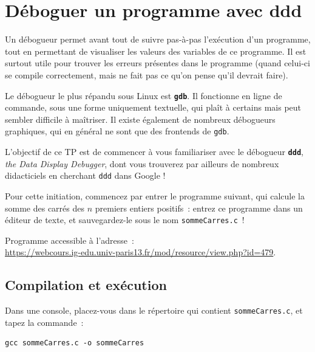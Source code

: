 \documentclass[12pt,a4paper]{article}
\begin{document}

\newcommand{\puis}{\ensuremath{\rightarrow\ }}

\section{Déboguer un programme avec ddd}

Un débogueur permet avant tout de suivre pas-à-pas l'exécution d'un
programme, tout en permettant de visualiser les valeurs des variables
de ce programme. Il est surtout utile pour trouver les erreurs
présentes dans le programme (quand celui-ci se compile correctement,
mais ne fait pas ce qu'on pense qu'il devrait faire). 

Le débogueur le plus répandu sous Linux est {\bf \tt gdb}. Il fonctionne
en ligne de commande, sous une forme uniquement textuelle, qui plaît à
certains mais peut sembler difficile à maîtriser. Il existe également de
nombreux débogueurs graphiques, qui en général ne sont que des
frontends de {\tt gdb}.

L'objectif de ce TP est de commencer à vous familiariser avec le
débogueur {\tt \bf ddd}, \emph{the Data Display Debugger}, dont vous
trouverez par ailleurs de nombreux didacticiels en cherchant {\tt ddd}
dans Google !


Pour cette initiation, commencez par entrer le programme suivant, qui
calcule la somme des carrés des $n$ premiers entiers positifs~: entrez
ce programme dans un éditeur de texte, et sauvegardez-le sous le nom
{\tt sommeCarres.c}~!




\begin{cpii}
  Programme accessible à l'adresse~:\\
  \href{https://webcours.ig-edu.univ-paris13.fr/mod/resource/view.php?id=479}{https://webcours.ig-edu.univ-paris13.fr/mod/resource/view.php?id=479}.
\end{cpii}

\subsection{Compilation et exécution}

Dans une console, placez-vous dans
le répertoire qui contient {\tt sommeCarres.c}, et tapez la commande~:
\begin{verbatim}
gcc sommeCarres.c -o sommeCarres
\end{verbatim}
\end{document}

